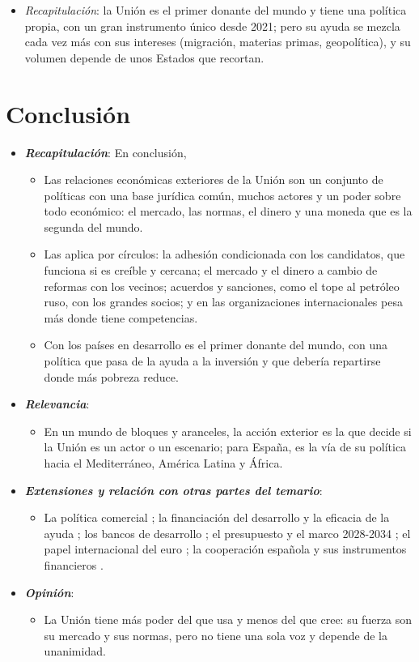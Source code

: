 \documentclass[11pt]{article}
\begin{document}
\begin{itemize}
\item \emph{Recapitulación}: la Unión es el primer donante del mundo y tiene una política propia, con un gran instrumento único desde 2021; pero su ayuda se mezcla cada vez más con sus intereses (migración, materias primas, geopolítica), y su volumen depende de unos Estados que recortan.
\end{itemize}

\section*{Conclusión}

\begin{itemize}
\item \textbf{\emph{Recapitulación}}: En conclusión,
  \begin{itemize}
  \item Las relaciones económicas exteriores de la Unión son un conjunto de políticas con una base jurídica común, muchos actores y un poder sobre todo económico: el mercado, las normas, el dinero y una moneda que es la segunda del mundo.
  \item Las aplica por círculos: la adhesión condicionada con los candidatos, que funciona si es creíble y cercana; el mercado y el dinero a cambio de reformas con los vecinos; acuerdos y sanciones, como el tope al petróleo ruso, con los grandes socios; y en las organizaciones internacionales pesa más donde tiene competencias.
  \item Con los países en desarrollo es el primer donante del mundo, con una política que pasa de la ayuda a la inversión y que debería repartirse donde más pobreza reduce.
  \end{itemize}
\item \textbf{\emph{Relevancia}}:
  \begin{itemize}
  \item En un mundo de bloques y aranceles, la acción exterior es la que decide si la Unión es un actor o un escenario; para España, es la vía de su política hacia el Mediterráneo, América Latina y África.
  \end{itemize}
\item \textbf{\emph{Extensiones y relación con otras partes del temario}}:
  \begin{itemize}
  \item La política comercial ; la financiación del desarrollo y la eficacia de la ayuda ; los bancos de desarrollo ; el presupuesto y el marco 2028-2034 ; el papel internacional del euro ; la cooperación española y sus instrumentos financieros  .
  \end{itemize}
\item \textbf{\emph{Opinión}}:
  \begin{itemize}
  \item La Unión tiene más poder del que usa y menos del que cree: su fuerza son su mercado y sus normas, pero no tiene una sola voz y depende de la unanimidad.


\end{itemize}
\end{itemize}
\end{document}
